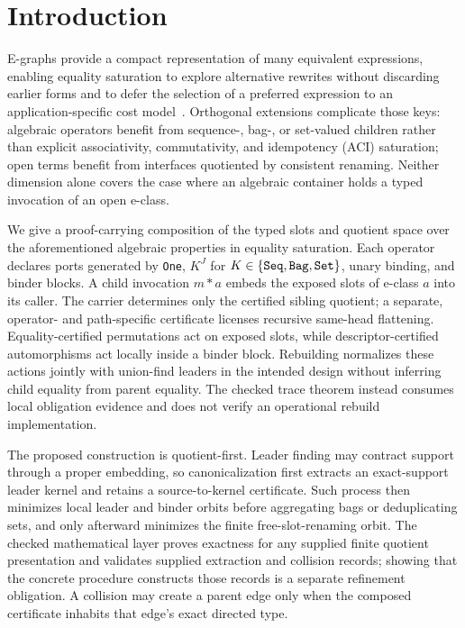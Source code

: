 \section{Introduction}

E-graphs provide a compact representation of many equivalent expressions, enabling equality saturation to explore alternative rewrites without discarding earlier forms and to defer the selection of a preferred expression to an application-specific cost model~\cite{ogEgraphs1,egraphsOG,eqsat,eqsat-lmcs,egg}. %
Orthogonal extensions complicate those keys: algebraic operators benefit
from sequence-, bag-, or set-valued children rather than explicit
associativity, commutativity, and idempotency (ACI) saturation; open terms
benefit from interfaces quotiented by consistent renaming.  Neither dimension
alone covers the case where an algebraic container holds a typed invocation
of an open e-class.

We give a proof-carrying composition of the typed slots and quotient space over the aforementioned algebraic properties in equality saturation. %
Each operator declares ports generated
by \texttt{One}, $K^J$ for $K\in\{\texttt{Seq},\texttt{Bag},\texttt{Set}\}$, unary binding, and
binder blocks.  A child invocation $m*a$ embeds the exposed slots of e-class
$a$ into its caller.  The carrier determines only the certified sibling
quotient; a separate, operator- and path-specific certificate licenses
recursive same-head flattening.  Equality-certified permutations act on
exposed slots, while descriptor-certified automorphisms act locally inside a
binder block.  Rebuilding normalizes these actions jointly with union-find
leaders in the intended design without inferring child equality from parent
equality.  The checked trace theorem instead consumes local obligation
evidence and does not verify an operational rebuild implementation.

The proposed construction is quotient-first.  Leader finding may contract
support through a proper embedding, so canonicalization first extracts an
exact-support leader kernel and retains a source-to-kernel certificate. Such process 
then minimizes local leader and binder orbits before aggregating bags or
deduplicating sets, and only afterward minimizes the finite free-slot-renaming
orbit.  The checked mathematical layer proves exactness for any supplied
finite quotient presentation and validates supplied extraction and collision
records; showing that the concrete procedure constructs those records is a
separate refinement obligation.  A collision may create a parent edge only
when the composed certificate inhabits that edge's exact directed type.

